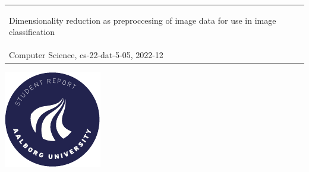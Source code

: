 \begin{titlepage}
{{\begin{tabular}{@{}p{\textwidth}@{}}
\begin{center}
          \Large{
            Dimensionality reduction as preproccesing of image data for use in image classification%
          }
        \end{center}
        \vspace{0.2cm}
        \begin{center}
          {\Large
            Daniel Runge Petersen, Gustav Svante Graversen, Lars Emanuel Hansen, Raymond Kacso, Sebastian Aaholm%
          }\\
          \vspace{0.2cm}
          {\large
            Computer Science, cs-22-dat-5-05, 2022-12%
          }
        \end{center}
        \vspace{0.2cm}
        \begin{center}
          {\Large
            Semester Project
          }
        \end{center}
      \end{tabular}}}
  \vfill
  \begin{center}
    \includegraphics[width=0.2\paperwidth]{figures/AAUgraphics/aau_logo_circle_en}%
  \end{center}
\end{titlepage}
\clearpage
